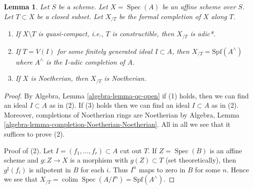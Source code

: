 \documentclass{stacks-project}
\theoremstyle{plain}
\newtheorem{lemma}[subsection]{Lemma}
\theoremstyle{definition}
\theoremstyle{remark}
\numberwithin{equation}{subsection}
\def\colim{\mathop{\mathrm{colim}}\nolimits}
\def\Spec{\mathop{\mathrm{Spec}}}
\begin{document}
\begin{lemma}
\label{lemma-affine-formal-completion-types}
Let $S$ be a scheme. Let $X = \Spec(A)$ be an affine scheme over $S$.
Let $T \subset X$ be a closed subset. Let $X_{/T}$ be the
formal completion of $X$ along $T$.
\begin{enumerate}
\item If $X \setminus T$ is quasi-compact, i.e., $T$ is constructible,
then $X_{/T}$ is adic*.
\item If $T = V(I)$ for some finitely generated ideal $I \subset A$,
then $X_{/T} = \text{Spf}(A^\wedge)$ where $A^\wedge$ is the
$I$-adic completion of $A$.
\item If $X$ is Noetherian, then $X_{/T}$ is Noetherian.
\end{enumerate}
\end{lemma}

\begin{proof}
By Algebra, Lemma \ref{algebra-lemma-qc-open} if (1) holds, then
we can find an ideal $I \subset A$ as in (2). If (3) holds then
we can find an ideal $I \subset A$ as in (2). Moreover, completions
of Noetherian rings are Noetherian by
Algebra, Lemma \ref{algebra-lemma-completion-Noetherian-Noetherian}.
All in all we see that it suffices to prove (2).

\medskip\noindent
Proof of (2).
Let $I = (f_1, \ldots, f_r) \subset A$ cut out $T$.
If $Z = \Spec(B)$ is an affine scheme and $g : Z \to X$ is
a morphism with $g(Z) \subset T$ (set theoretically), then
$g^\sharp(f_i)$ is nilpotent in $B$ for each $i$. Thus
$I^n$ maps to zero in $B$ for some $n$. Hence we see that
$X_{/T} = \colim \Spec(A/I^n) = \text{Spf}(A^\wedge)$.
\end{proof}
\end{document}
